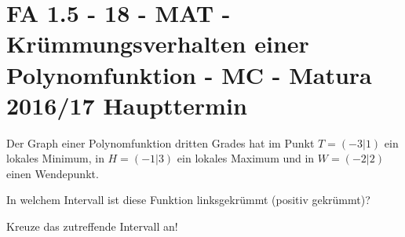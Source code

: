 \section{FA 1.5 - 18 - MAT - Krümmungsverhalten einer Polynomfunktion - MC - Matura 2016/17 Haupttermin}

\begin{beispiel}[FA 1.5]{1} %
Der Graph einer Polynomfunktion dritten Grades hat im Punkt $T = (-3|1)$ ein lokales Minimum, in $H=(-1|3)$ ein lokales Maximum und in $W = (-2|2)$ einen Wendepunkt. \leer

In welchem Intervall ist diese Funktion linksgekrümmt (positiv gekrümmt)? 

Kreuze das zutreffende Intervall an! \leer

\end{beispiel}